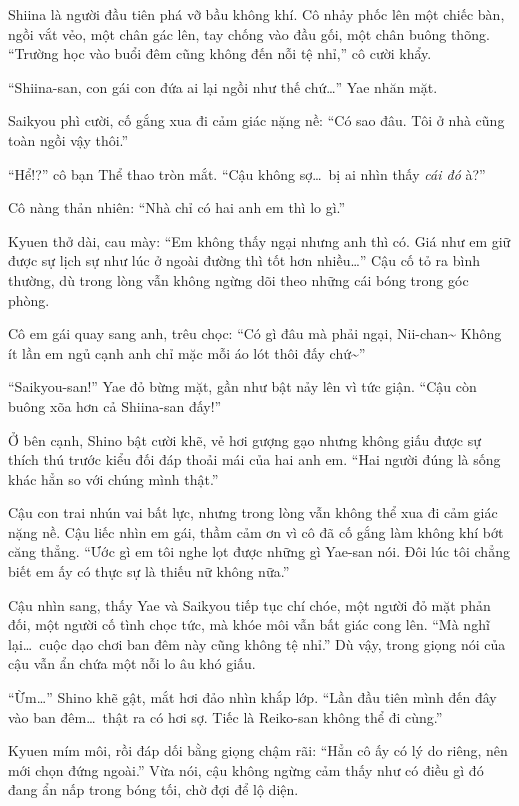 \documentclass[../main.tex]{subfiles}
\begin{document}
Shiina là người đầu tiên phá vỡ bầu không khí. Cô nhảy phốc lên một chiếc bàn, ngồi vắt vẻo, một chân gác lên, tay chống vào đầu gối, một chân buông thõng. ``Trường học vào buổi đêm cũng không đến nỗi tệ nhỉ,'' cô cười khẩy.


``Shiina-san, con gái con đứa ai lại ngồi như thế chứ\dots'' Yae nhăn mặt.

Saikyou phì cười, cố gắng xua đi cảm giác nặng nề: ``Có sao đâu. Tôi ở nhà cũng toàn ngồi vậy thôi.''

``Hể!?'' cô bạn Thể thao tròn mắt. ``Cậu không sợ\dots\ bị ai nhìn thấy \emph{cái đó} à?''

Cô nàng thản nhiên: ``Nhà chỉ có hai anh em thì lo gì.''

Kyuen thở dài, cau mày: ``Em không thấy ngại nhưng anh thì có. Giá như em giữ được sự lịch sự như lúc ở ngoài đường thì tốt hơn nhiều\dots'' Cậu cố tỏ ra bình thường, dù trong lòng vẫn không ngừng dõi theo những cái bóng trong góc phòng.

Cô em gái quay sang anh, trêu chọc: ``Có gì đâu mà phải ngại, Nii-chan\~{} Không ít lần em ngủ cạnh anh chỉ mặc mỗi áo lót thôi đấy chứ\~{}''

``Saikyou-san!'' Yae đỏ bừng mặt, gần như bật nảy lên vì tức giận. ``Cậu còn buông xõa hơn cả Shiina-san đấy!''

Ở bên cạnh, Shino bật cười khẽ, vẻ hơi gượng gạo nhưng không giấu được sự thích thú trước kiểu đối đáp thoải mái của hai anh em. ``Hai người đúng là sống khác hẳn so với chúng mình thật.''

Cậu con trai nhún vai bất lực, nhưng trong lòng vẫn không thể xua đi cảm giác nặng nề. Cậu liếc nhìn em gái, thầm cảm ơn vì cô đã cố gắng làm không khí bớt căng thẳng. ``Ước gì em tôi nghe lọt được những gì Yae-san nói. Đôi lúc tôi chẳng biết em ấy có thực sự là thiếu nữ không nữa.''

Cậu nhìn sang, thấy Yae và Saikyou tiếp tục chí chóe, một người đỏ mặt phản đối, một người cố tình chọc tức, mà khóe môi vẫn bất giác cong lên. ``Mà nghĩ lại\dots\ cuộc dạo chơi ban đêm này cũng không tệ nhỉ.'' Dù vậy, trong giọng nói của cậu vẫn ẩn chứa một nỗi lo âu khó giấu.

``Ừm\dots'' Shino khẽ gật, mắt hơi đảo nhìn khắp lớp. ``Lần đầu tiên mình đến đây vào ban đêm\dots\ thật ra có hơi sợ. Tiếc là Reiko-san không thể đi cùng.''

Kyuen mím môi, rồi đáp dối bằng giọng chậm rãi: ``Hẳn cô ấy có lý do riêng, nên mới chọn đứng ngoài.'' Vừa nói, cậu không ngừng cảm thấy như có điều gì đó đang ẩn nấp trong bóng tối, chờ đợi để lộ diện.
\end{document}
